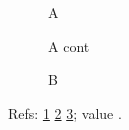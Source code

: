 \documentclass{article}
\begin{document}
\begin{figure}\caption{A}\label{fa}\end{figure}
\begin{figure}\ContinuedFloat\caption{A cont}\label{fb}\end{figure}
\begin{figure}\caption{B}\label{fc}\end{figure}
Refs: \ref{fa} \ref{fb} \ref{fc}; value \the\value{figure}.
\end{document}
